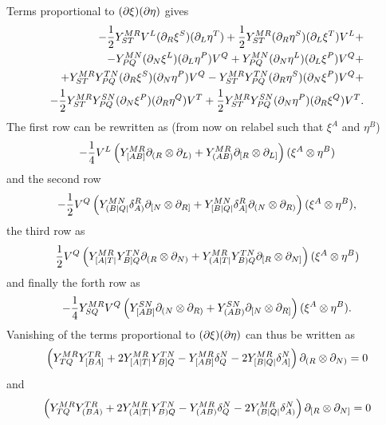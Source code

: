 \documentclass{article}
\begin{document}
Terms proportional to $(\partial\xi)(\partial\eta)$ gives
\begin{align*}
    -\frac{1}{2}Y^{MR}_{ST}V^L(\partial_R\xi^S)(\partial_L\eta^T)+\frac{1}{2}Y^{MR}_{ST}(\partial_R\eta^S)(\partial_L\xi^T)V^L+\\
    -Y^{MN}_{PQ}(\partial_N\xi^L)(\partial_L\eta^P)V^Q+Y^{MN}_{PQ}(\partial_N\eta^L)(\partial_L\xi^P)V^Q+\\
    +Y^{MR}_{ST}Y^{TN}_{PQ}(\partial_R\xi^S)(\partial_N\eta^P)V^Q-Y^{MR}_{ST}Y^{TN}_{PQ}(\partial_R\eta^S)(\partial_N\xi^P)V^Q+\\
    -\frac{1}{2}Y^{MR}_{ST}Y^{SN}_{PQ}(\partial_N\xi^P)(\partial_R\eta^Q)V^T+\frac{1}{2}Y^{MR}_{ST}Y^{SN}_{PQ}(\partial_N\eta^P)(\partial_R\xi^Q)V^T.
\end{align*}
The first row can be rewritten as (from now on relabel such that $\xi^A$ and $\eta^B$)
\begin{equation}
    -\frac{1}{4}V^L\left(Y^{MR}_{[AB]}\partial_{(R}\otimes\partial_{L)}+Y^{MR}_{(AB)}\partial_{[R}\otimes\partial_{L]}\right)(\xi^A\otimes \eta^B)
\end{equation}
and the second row
\begin{equation}
    -\frac{1}{2}V^Q\left(Y^{MN}_{(B|Q|}\delta^R_{A)}\partial_{[N}\otimes\partial_{R]}+Y^{MN}_{[B|Q|}\delta^R_{A]}\partial_{(N}\otimes\partial_{R)}\right)(\xi^A\otimes \eta^B),
\end{equation}
the third row as 
\begin{equation}
    \frac{1}{2}V^Q\left(Y^{MR}_{[A|T|}Y^{TN}_{B]Q}\partial_{(R}\otimes\partial_{N)}+Y^{MR}_{(A|T|}Y^{TN}_{B)Q}\partial_{[R}\otimes\partial_{N]}\right)(\xi^A\otimes \eta^B)
\end{equation}
and finally the forth row as 
\begin{equation}
    -\frac{1}{4}Y^{MR}_{SQ}V^Q\left(Y^{SN}_{[AB]}\partial_{(N}\otimes\partial_{R)}+Y^{SN}_{(AB)}\partial_{[N}\otimes\partial_{R]}\right)(\xi^A\otimes \eta^B).
\end{equation}
Vanishing of the terms proportional to $(\partial\xi)(\partial\eta)$ can thus be written as 
\begin{equation}
\left(Y^{MR}_{TQ}Y^{TR}_{[BA]}+2Y^{MR}_{[A|T|}Y^{TN}_{B]Q}-Y^{MR}_{[AB]}\delta_Q^N-2Y^{MR}_{[B|Q|}\delta^N_{A]}\right)\partial_{(R}\otimes\partial_{N)}=0
\end{equation}
and
\begin{equation}
\left(Y^{MR}_{TQ}Y^{TR}_{(BA)}+2Y^{MR}_{(A|T|}Y^{TN}_{B)Q}-Y^{MR}_{(AB)}\delta_Q^N-2Y^{MR}_{(B|Q|}\delta^N_{A)}\right)\partial_{[R}\otimes\partial_{N]}=0
\end{equation}
\end{document}
